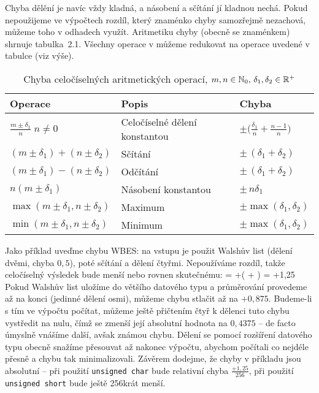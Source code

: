        Chyba dělění je navíc vždy kladná, a násobení a sčítání jí kladnou nechá. Pokud nepoužijeme ve výpočtech rozdíl, který znaménko chyby samozřejmě nezachová, můžeme toho v odhadech využít. Aritmetiku chyby (obecně se znaménkem) shrnuje tabulka~2.1. Všechny operace v \LAsq můžeme redukovat na operace uvedené v tabulce (viz výše).

        \begin{table}[h]
    \begin{center}
    \begin{tabular}{lll}
      \toprule
      Operace & Popis & Chyba\\
      \midrule
      $\frac{m\pm\delta_1}{n} \; n \neq 0 $ & Celočíselné dělení konstantou & $\pm \Big( \frac{\delta_1}{n} + \frac{n-1}{n}\Big)$ \\
      $(m\pm\delta_1)+(n\pm\delta_2) $      & Sčítání                       & $\pm \,(\delta_1+\delta_2)$ \\
      $(m\pm\delta_1)-(n\pm\delta_2) $      & Odčítání                      & $\pm \,(\delta_1+\delta_2)$ \\
      $n(m\pm\delta_1) $                    & Násobení konstantou           & $\pm \,n\delta_1$ \\
      $\max(m\pm\delta_1,n\pm\delta_2) $    & Maximum                       & $\pm \max(\delta_1,\delta_2)$ \\
      $\min(m\pm\delta_1,n\pm\delta_2) $    & Minimum                       & $\pm \max(\delta_1,\delta_2)$ \\
      \bottomrule
    \end{tabular}
    \caption{Chyba celočíselných aritmetických operací, $m,n \in \mathbb{N}_0, \,\delta_1,\delta_2 \in \mathbb{R}^+$}
    \end{center}
        \end{table}\label{tabulka max chyby}

        Jako příklad uveďme chybu WBES: na vstupu je použit Walshův list (dělení dvěmi, chyba $0,5$), poté sčítání a dělení čtyřmi. Nepoužíváme rozdíl, takže celočíselný výsledek bude menší nebo rovnen skutečnému:
        \beq
        \delta = +\Big(  +  \Big) = +1,25
        \eeq
        Pokud Walshův list uložíme do většího datového typu a průměrování provedeme až na konci (jedinné dělení osmi), můžeme chybu stlačit až na $+0,875$. Budeme-li s tím ve výpočtu počítat, můžeme ještě přičtením čtyř k dělenci tuto chybu vystředit na nulu, čímž se zmenší její absolutní hodnota na $0,4375$ -- de facto úmyslně vnášíme další, avšak známou chybu. Dělení se pomocí rozšíření datového typu obecně snažíme přesouvat až nakonec výpočtu, abychom počítali co nejdéle přesně a chybu tak minimalizovali. Závěrem dodejme, že chyby v příkladu jsou absolutní -- při použití {\tt unsigned char} bude relativní chyba $\frac{+1,25}{256}$, při použití {\tt unsigned short} bude ještě 256krát menší. 

